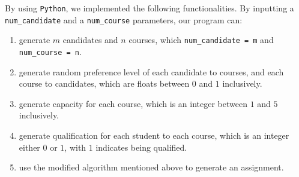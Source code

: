 \documentclass[twoside,twocolumn]{article}
\begin{document}
    By using \verb|Python|, we implemented the following functionalities. 
    By inputting a \verb|num_candidate| and a \verb|num_course| parameters, our program can:
    \begin{enumerate}
        \item generate $m$ candidates and $n$ courses, which \verb|num_candidate = m| and \verb|num_course = n|.
        \item generate random preference level of each candidate to courses, and each course to candidates, which are
        floats between $0$ and $1$ inclusively.
        \item generate capacity for each course, which is an integer between $1$ and $5$ inclusively.
        \item generate qualification for each student to each course, which is an integer either $0$ or $1$, with $1$ indicates
        being qualified.
        \item use the modified algorithm mentioned above to generate an assignment.
    \end{enumerate}
\end{document}
